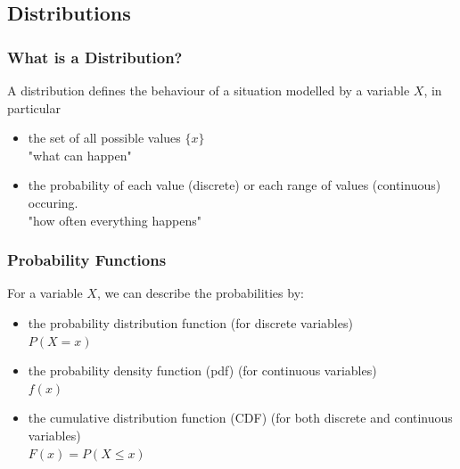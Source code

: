 \documentclass[t,xcolor=pdftex,dvipsnames,table]{beamer}
\begin{document}
\subsection[Distributions]{Distributions}
\begin{frame}\frametitle{What is a Distribution?}
\begin{definition}[Distribution]
A \alert{distribution} defines the behaviour of a situation modelled by a variable $X$, in particular
\begin{itemize}
\item the set of all possible values $\{ x \}$ \\
"what can happen"

\item the probability of each value (discrete) or each range of values (continuous) occuring.\\
"how often everything happens"
\end{itemize}

\end{definition}
\end{frame}

\begin{frame}[fragile, label=CDF]\frametitle{Probability Functions}

\begin{definition}

For a variable $X$, we can describe the probabilities by:
\begin{itemize}
\item the \alert{probability distribution function} (for discrete variables) \\ 
$P(X=x)$

\item  the \alert{probability density function (pdf)} (for continuous variables) \\  $f(x)$ \\
\item  the \alert{cumulative distribution function (CDF)} (for both discrete and continuous variables)  \\
$F(x) = P(X \leq x)$

\end{itemize}
\end{definition}
\end{frame}
\end{document}
